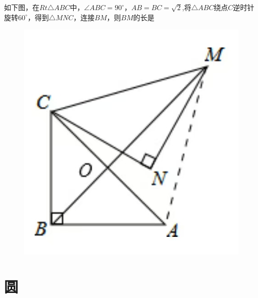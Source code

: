 \documentclass[lang=cn, 10pt, titlestyle=display, oneside, toc=twocol]{elegantbook}
\begin{document}
\begin{example}
    如下图，在\(Rt\triangle ABC \)中，\(\angle ABC = 90^\circ \)，\(AB=BC=\sqrt{2}\),将\(\triangle ABC\)绕点\(C\)逆时针旋转\(60^\circ\)，得到\(\triangle MNC\)，连接\(BM\)，则\(BM\)的长是 \underline{\hspace{3em}}
    
\begin{figure}[h]
    \raggedright
    \includegraphics[width=0.25\linewidth]{figure/example_rotation1.jpg}
    
    \label{fig:enter-label}
\end{figure}
    
\end{example}



\chapter{圆}
\end{document}
